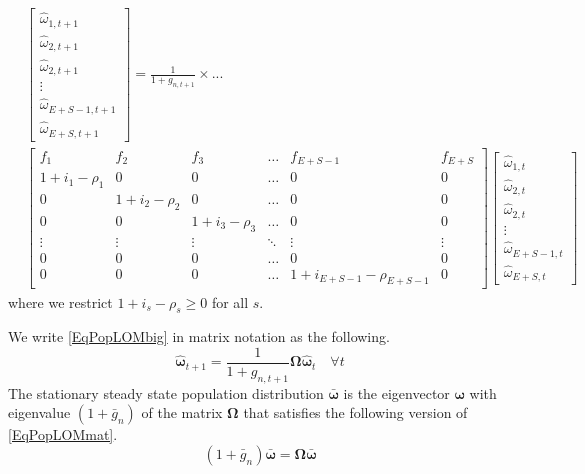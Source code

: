 \documentclass[12pt]{report}
\theoremstyle{definition}
\begin{document}
  \begin{equation}\label{EqPopLOMbig}
  \begin{split}
    & \begin{bmatrix}
      \hat{\omega}_{1,t+1} \\ \hat{\omega}_{2,t+1} \\ \hat{\omega}_{2,t+1} \\ \vdots \\ \hat{\omega}_{E+S-1,t+1} \\ \hat{\omega}_{E+S,t+1}
    \end{bmatrix}= \frac{1}{1 + g_{n,t+1}} \times ... \\
    & \begin{bmatrix}
      f_1 & f_2 & f_3 & \hdots & f_{E+S-1} & f_{E+S} \\
      1+i_1-\rho_1 & 0 & 0 & \hdots & 0 & 0 \\
      0 & 1+i_2-\rho_2 & 0 & \hdots & 0 & 0 \\
      0 & 0 & 1+i_3-\rho_3 & \hdots & 0 & 0 \\
      \vdots & \vdots & \vdots & \ddots & \vdots & \vdots \\
      0 & 0 & 0 & \hdots & 0 & 0 \\
      0 & 0 & 0 & \hdots & 1+i_{E+S-1}-\rho_{E+S-1} & 0
    \end{bmatrix}
    \begin{bmatrix}
      \hat{\omega}_{1,t} \\ \hat{\omega}_{2,t} \\ \hat{\omega}_{2,t} \\ \vdots \\ \hat{\omega}_{E+S-1,t} \\ \hat{\omega}_{E+S,t}
    \end{bmatrix}
  \end{split}
  \end{equation}
  where we restrict $1+i_s-\rho_s\geq 0$ for all $s$.

  We write \eqref{EqPopLOMbig} in matrix notation as the following.
  \begin{equation}\label{EqPopLOMmat}
    \bm{\hat{\omega}}_{t+1} = \frac{1}{1+g_{n,t+1}}\bm{\Omega}\bm{\hat{\omega}}_t \quad\forall t
  \end{equation}
  The stationary steady state population distribution $\bm{\bar{\omega}}$ is the eigenvector $\bm{\omega}$ with eigenvalue $(1+\bar{g}_n)$ of the matrix $\bm{\Omega}$ that satisfies the following version of \eqref{EqPopLOMmat}.
  \begin{equation}\label{EqPopLOMss}
    (1+\bar{g}_n)\bm{\bar{\omega}} = \bm{\Omega}\bm{\bar{\omega}}
  \end{equation}
\end{document}
